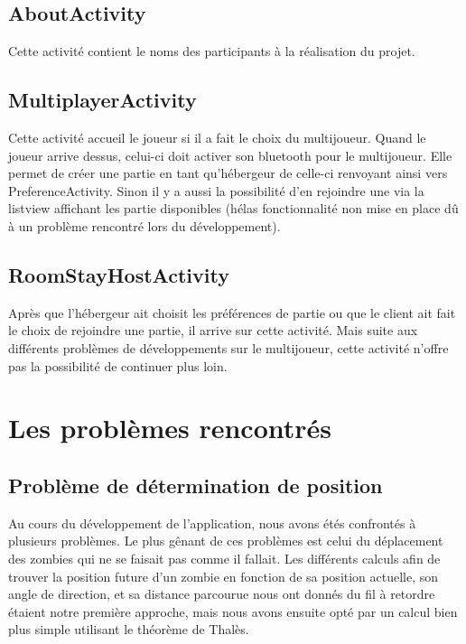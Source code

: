 \documentclass{article}
\begin{document}
\subsection{AboutActivity}

Cette activité contient le noms des participants à la réalisation du projet.

\subsection{MultiplayerActivity}

Cette activité accueil le joueur si il a fait le choix du multijoueur. Quand le joueur arrive dessus, celui-ci doit activer son bluetooth pour le multijoueur. Elle permet de créer une partie en tant qu'hébergeur de celle-ci renvoyant ainsi vers PreferenceActivity. Sinon il y a aussi la possibilité d'en rejoindre une via la listview affichant les partie disponibles (hélas fonctionnalité non mise en place dû à un problème rencontré lors du développement).  

\subsection{RoomStayHostActivity}

Après que l'hébergeur ait choisit les préférences de partie ou que le client ait fait le choix de rejoindre une partie, il arrive sur cette activité. Mais suite aux différents problèmes de développements sur le multijoueur, cette activité n'offre pas la possibilité de continuer plus loin. 

\section{Les problèmes rencontrés}

\subsection{Problème de détermination de position}

Au cours du développement de l'application, nous avons étés confrontés à plusieurs problèmes. Le plus gênant de ces problèmes est celui du déplacement des zombies qui ne se faisait pas comme il fallait.
Les différents calculs afin de trouver la position future d'un zombie en fonction de sa position actuelle, son angle de direction, et sa distance parcourue nous ont donnés du fil à retordre étaient notre première approche, mais nous avons ensuite opté par un calcul bien plus simple utilisant le théorème de Thalès.
\end{document}
